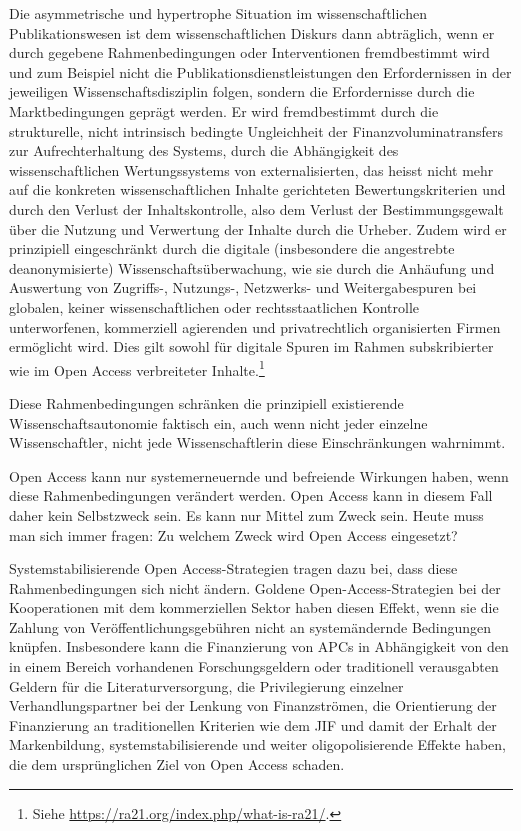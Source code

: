 \documentclass[a4paper,
fontsize=11pt,
oneside,
numbers=noperiodatend,
parskip=half-,
bibliography=totoc,
final
]{scrartcl}
\begin{document}
Die asymmetrische und hypertrophe Situation im wissenschaftlichen
Publikationswesen ist dem wissenschaftlichen Diskurs dann abträglich,
wenn er durch gegebene Rahmenbedingungen oder Interventionen
fremdbestimmt wird und zum Beispiel nicht die
Publikationsdienstleistungen den Erfordernissen in der jeweiligen
Wissenschaftsdisziplin folgen, sondern die Erfordernisse durch die
Marktbedingungen geprägt werden. Er wird fremdbestimmt durch die
strukturelle, nicht intrinsisch bedingte Ungleichheit der
Finanzvoluminatransfers zur Aufrechterhaltung des Systems, durch die
Abhängigkeit des wissenschaftlichen Wertungssystems von
externalisierten, das heisst nicht mehr auf die konkreten
wissenschaftlichen Inhalte gerichteten Bewertungskriterien und durch den
Verlust der Inhaltskontrolle, also dem Verlust der Bestimmungsgewalt
über die Nutzung und Verwertung der Inhalte durch die Urheber. Zudem
wird er prinzipiell eingeschränkt durch die digitale (insbesondere die
angestrebte deanonymisierte) Wissenschaftsüberwachung, wie sie durch die
Anhäufung und Auswertung von Zugriffs-, Nutzungs-, Netzwerks- und
Weitergabespuren bei globalen, keiner wissenschaftlichen oder
rechtsstaatlichen Kontrolle unterworfenen, kommerziell agierenden und
privatrechtlich organisierten Firmen ermöglicht wird. Dies gilt sowohl
für digitale Spuren im Rahmen subskribierter wie im Open Access
verbreiteter Inhalte.\footnote{Siehe
  \url{https://ra21.org/index.php/what-is-ra21/}.}

Diese Rahmenbedingungen schränken die prinzipiell existierende
Wissenschaftsautonomie faktisch ein, auch wenn nicht jeder einzelne
Wissenschaftler, nicht jede Wissenschaftlerin diese Einschränkungen
wahrnimmt.

Open Access kann nur systemerneuernde und befreiende Wirkungen haben,
wenn diese Rahmenbedingungen verändert werden. Open Access kann in
diesem Fall daher kein Selbstzweck sein. Es kann nur Mittel zum Zweck
sein. Heute muss man sich immer fragen: Zu welchem Zweck wird Open
Access eingesetzt?

Systemstabilisierende Open Access-Strategien tragen dazu bei, dass diese
Rahmenbedingungen sich nicht ändern. Goldene Open-Access-Strategien bei
der Kooperationen mit dem kommerziellen Sektor haben diesen Effekt, wenn
sie die Zahlung von Veröffentlichungsgebühren nicht an systemändernde
Bedingungen knüpfen. Insbesondere kann die Finanzierung von APCs in
Abhängigkeit von den in einem Bereich vorhandenen Forschungsgeldern oder
traditionell verausgabten Geldern für die Literaturversorgung, die
Privilegierung einzelner Verhandlungspartner bei der Lenkung von
Finanzströmen, die Orientierung der Finanzierung an traditionellen
Kriterien wie dem JIF und damit der Erhalt der Markenbildung,
systemstabilisierende und weiter oligopolisierende Effekte haben, die
dem ursprünglichen Ziel von Open Access schaden.
\end{document}
